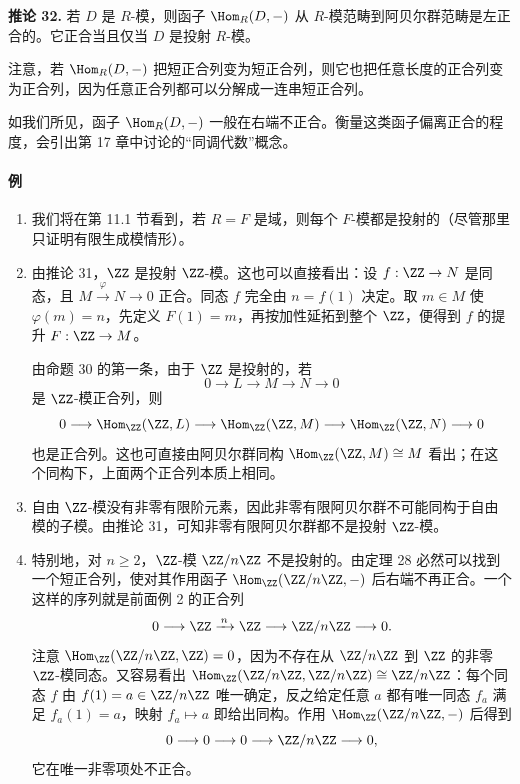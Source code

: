 \noindent\textbf{推论 32.} 若 $D$ 是 $R$-模，则函子 $\Hom_R(D,-)$ 从 $R$-模范畴到阿贝尔群范畴是左正合的。它正合当且仅当 $D$ 是投射 $R$-模。

注意，若 $\Hom_R(D,-)$ 把短正合列变为短正合列，则它也把任意长度的正合列变为正合列，因为任意正合列都可以分解成一连串短正合列。

如我们所见，函子 $\Hom_R(D,-)$ 一般在右端不正合。衡量这类函子偏离正合的程度，会引出第 17 章中讨论的“同调代数”概念。

\paragraph{例}
\begin{enumerate}[label=(\arabic*)]
\item 我们将在第 11.1 节看到，若 $R=F$ 是域，则每个 $F$-模都是投射的（尽管那里只证明有限生成模情形）。

\item 由推论 31，$\ZZ$ 是投射 $\ZZ$-模。这也可以直接看出：设 $f:\ZZ\to N$ 是同态，且 $M\xrightarrow{\varphi}N\to0$ 正合。同态 $f$ 完全由 $n=f(1)$ 决定。取 $m\in M$ 使 $\varphi(m)=n$，先定义 $F(1)=m$，再按加性延拓到整个 $\ZZ$，便得到 $f$ 的提升 $F:\ZZ\to M$。

由命题 30 的第一条，由于 $\ZZ$ 是投射的，若
\[
0\longrightarrow L\longrightarrow M\longrightarrow N\longrightarrow0
\]
是 $\ZZ$-模正合列，则
\[
0\longrightarrow\Hom_\ZZ(\ZZ,L)\longrightarrow\Hom_\ZZ(\ZZ,M)\longrightarrow\Hom_\ZZ(\ZZ,N)\longrightarrow0
\]
也是正合列。这也可直接由阿贝尔群同构 $\Hom_\ZZ(\ZZ,M)\cong M$ 看出；在这个同构下，上面两个正合列本质上相同。

\item 自由 $\ZZ$-模没有非零有限阶元素，因此非零有限阿贝尔群不可能同构于自由模的子模。由推论 31，可知非零有限阿贝尔群都不是投射 $\ZZ$-模。

\item 特别地，对 $n\geq2$，$\ZZ$-模 $\ZZ/n\ZZ$ 不是投射的。由定理 28 必然可以找到一个短正合列，使对其作用函子 $\Hom_\ZZ(\ZZ/n\ZZ,-)$ 后右端不再正合。一个这样的序列就是前面例 2 的正合列
\[
0\longrightarrow\ZZ\xrightarrow{\,n\,}\ZZ\longrightarrow\ZZ/n\ZZ\longrightarrow0.
\]
注意 $\Hom_\ZZ(\ZZ/n\ZZ,\ZZ)=0$，因为不存在从 $\ZZ/n\ZZ$ 到 $\ZZ$ 的非零 $\ZZ$-模同态。又容易看出 $\Hom_\ZZ(\ZZ/n\ZZ,\ZZ/n\ZZ)\cong\ZZ/n\ZZ$：每个同态 $f$ 由 $f(1)=a\in\ZZ/n\ZZ$ 唯一确定，反之给定任意 $a$ 都有唯一同态 $f_a$ 满足 $f_a(1)=a$，映射 $f_a\mapsto a$ 即给出同构。作用 $\Hom_\ZZ(\ZZ/n\ZZ,-)$ 后得到
\[
0\longrightarrow0\longrightarrow0\longrightarrow\ZZ/n\ZZ\longrightarrow0,
\]
它在唯一非零项处不正合。


\end{enumerate}
